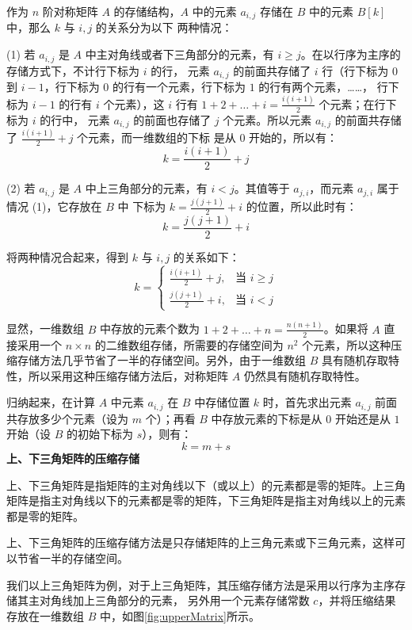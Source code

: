 \documentclass[lang=cn,newtx,10pt,scheme=chinese]{elegantbook}
\begin{document}
作为 $n$ 阶对称矩阵 $A$ 的存储结构，$A$ 中的元素 $a_{i,j}$ 存储在 $B$ 中的元素 $B[k]$ 中，那么 $k$ 与 $i,j$ 的关系分为以下
两种情况：

(1) 若 $a_{i,j}$ 是 $A$ 中主对角线或者下三角部分的元素，有 $i \geq j$。在以行序为主序的存储方式下，不计行下标为 $i$ 的行，
元素 $a_{i,j}$ 的前面共存储了 $i$ 行（行下标为 $0$ 到 $i-1$，行下标为 $0$ 的行有一个元素，行下标为 $1$ 的行有两个元素，……，
行下标为 $i-1$ 的行有 $i$ 个元素），这 $i$ 行有 $1 + 2 + \dots + i = \frac{i(i+1)}{2}$ 个元素；在行下标为 $i$ 的行中，
元素 $a_{i,j}$ 的前面也存储了 $j$ 个元素。所以元素 $a_{i,j}$ 的前面共存储了 $\frac{i(i+1)}{2} + j$ 个元素，而一维数组的下标
是从 $0$ 开始的，所以有：
\[
k = \frac{i(i+1)}{2} + j
\]

(2) 若 $a_{i,j}$ 是 $A$ 中上三角部分的元素，有 $i < j$。其值等于 $a_{j,i}$，而元素 $a_{j,i}$ 属于情况 (1)，它存放在 $B$ 中
下标为 $k = \frac{j(j+1)}{2} + i$ 的位置，所以此时有：
\[
k = \frac{j(j+1)}{2} + i
\]

将两种情况合起来，得到 $k$ 与 $i,j$ 的关系如下：
\[
k =
\begin{cases} 
\frac{i(i+1)}{2} + j, & \text{当 } i \geq j \\ 
\frac{j(j+1)}{2} + i, & \text{当 } i < j 
\end{cases}
\]

显然，一维数组 $B$ 中存放的元素个数为 $1 + 2 + \dots + n = \frac{n(n+1)}{2}$。如果将 $A$ 直接采用一个 $n \times n$ 的二维数组存储，所需要的存储空间为 $n^2$ 个元素，所以这种压缩存储方法几乎节省了一半的存储空间。另外，由于一维数组 $B$ 具有随机存取特性，所以采用这种压缩存储方法后，对称矩阵 $A$ 仍然具有随机存取特性。

归纳起来，在计算 $A$ 中元素 $a_{i,j}$ 在 $B$ 中存储位置 $k$ 时，首先求出元素 $a_{i,j}$ 前面共存放多少个元素（设为 $m$ 个）；再看 $B$ 中存放元素的下标是从 $0$ 开始还是从 $1$ 开始（设 $B$ 的初始下标为 $s$），则有：
\[
k = m + s
\]
\textbf{上、下三角矩阵的压缩存储}

上、下三角矩阵是指矩阵的主对角线以下（或以上）的元素都是零的矩阵。上三角矩阵是指主对角线以下的元素都是零的矩阵，下三角矩阵是指主对角线以上的元素都是零的矩阵。

上、下三角矩阵的压缩存储方法是只存储矩阵的上三角元素或下三角元素，这样可以节省一半的存储空间。

我们以上三角矩阵为例，对于上三角矩阵，其压缩存储方法是采用以行序为主序存储其主对角线加上三角部分的元素，
另外用一个元素存储常数 $c$，并将压缩结果存放在一维数组 $B$ 中，如图\ref{fig:upperMatrix}所示。
\end{document}
